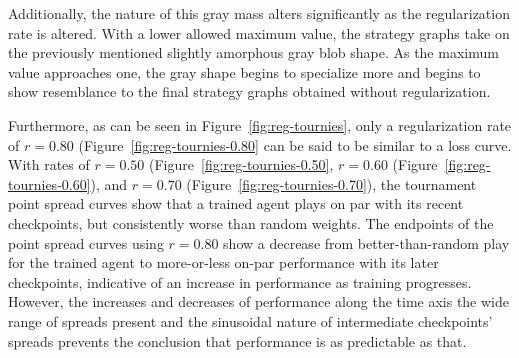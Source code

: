 Additionally,
the nature of this gray mass alters significantly as the regularization rate is
altered.
%
With a lower allowed maximum value,
the strategy graphs take on the previously mentioned slightly amorphous gray
blob shape.
%
As the maximum value approaches one,
the gray shape begins to specialize more and begins to show resemblance to the
final strategy graphs obtained without regularization.



Furthermore,
as can be seen in Figure~\ref{fig:reg-tournies},
only a regularization rate of $r = 0.80$ (Figure~\ref{fig:reg-tournies-0.80}
can be said to be similar to a loss curve.
%
With rates of $r=0.50$ (Figure~\ref{fig:reg-tournies-0.50},
$r = 0.60$ (Figure~\ref{fig:reg-tournies-0.60}),
and $r = 0.70$ (Figure~\ref{fig:reg-tournies-0.70}),
the tournament point spread curves show that a trained agent plays on par with
its recent checkpoints,
but consistently worse than random weights.
%
The endpoints of the point spread curves using $r = 0.80$
show a decrease from better-than-random play for the trained agent
to more-or-less on-par performance with its later checkpoints,
indicative of an increase in performance as training progresses.
%
However,
the increases and decreases of performance along the time axis
the wide range of spreads present and the sinusoidal nature of intermediate
checkpoints' spreads
prevents the conclusion that performance is as predictable as that.

